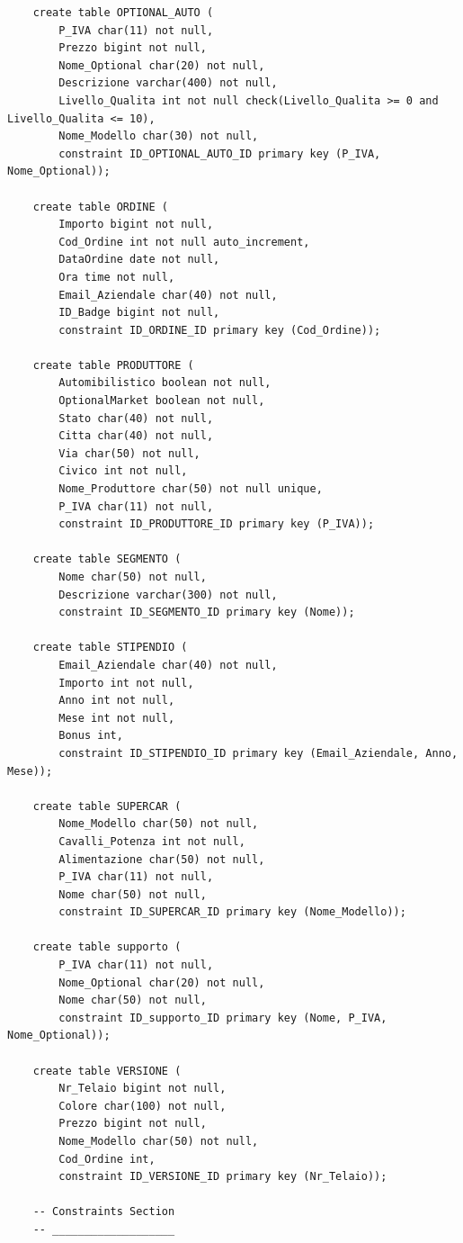 \documentclass[11pt]{article}
\begin{document}
\begin{lstlisting}
    create table OPTIONAL_AUTO (
        P_IVA char(11) not null, 
        Prezzo bigint not null,
        Nome_Optional char(20) not null,
        Descrizione varchar(400) not null,
        Livello_Qualita int not null check(Livello_Qualita >= 0 and Livello_Qualita <= 10),
        Nome_Modello char(30) not null,
        constraint ID_OPTIONAL_AUTO_ID primary key (P_IVA, Nome_Optional));

    create table ORDINE (
        Importo bigint not null,
        Cod_Ordine int not null auto_increment,
        DataOrdine date not null,
        Ora time not null,
        Email_Aziendale char(40) not null,
        ID_Badge bigint not null,
        constraint ID_ORDINE_ID primary key (Cod_Ordine));

    create table PRODUTTORE (
        Automibilistico boolean not null,
        OptionalMarket boolean not null,
        Stato char(40) not null,
        Citta char(40) not null,
        Via char(50) not null,
        Civico int not null,
        Nome_Produttore char(50) not null unique,
        P_IVA char(11) not null,
        constraint ID_PRODUTTORE_ID primary key (P_IVA));

    create table SEGMENTO (
        Nome char(50) not null,
        Descrizione varchar(300) not null,
        constraint ID_SEGMENTO_ID primary key (Nome));

    create table STIPENDIO (
        Email_Aziendale char(40) not null,
        Importo int not null,
        Anno int not null,
        Mese int not null,
        Bonus int,
        constraint ID_STIPENDIO_ID primary key (Email_Aziendale, Anno, Mese));

    create table SUPERCAR (
        Nome_Modello char(50) not null,
        Cavalli_Potenza int not null,
        Alimentazione char(50) not null,
        P_IVA char(11) not null,
        Nome char(50) not null,
        constraint ID_SUPERCAR_ID primary key (Nome_Modello));

    create table supporto (
        P_IVA char(11) not null,
        Nome_Optional char(20) not null,
        Nome char(50) not null,
        constraint ID_supporto_ID primary key (Nome, P_IVA, Nome_Optional));

    create table VERSIONE (
        Nr_Telaio bigint not null,
        Colore char(100) not null,
        Prezzo bigint not null,
        Nome_Modello char(50) not null,
        Cod_Ordine int,
        constraint ID_VERSIONE_ID primary key (Nr_Telaio));

    -- Constraints Section
    -- ___________________ 


\end{lstlisting}
\end{document}
